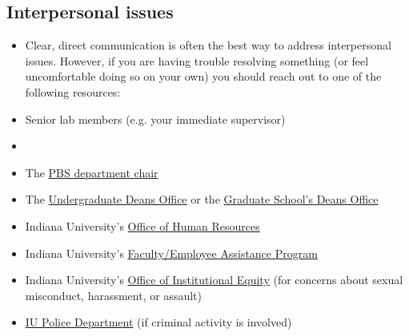 \documentclass{tufte-book} %
\begin{document}
\subsection{Interpersonal issues}\label{sec:interpersonal}
\begin{itemize}
\item Clear, direct communication is often the best way to address interpersonal issues. However, if you are having trouble resolving something (or feel uncomfortable doing so on your own) you should reach out to one of the following resources:

\item Senior lab members (e.g. your immediate supervisor)

\item \director

\item The \href{https://psych.indiana.edu/directory/faculty/hetrick-william-p.html}{PBS department chair}

\item The \href{https://studentaffairs.indiana.edu/dean-students/}{Undergraduate Deans Office} or the \href{https://graduate.indiana.edu/about/staff/index.html}{Graduate School's Deans Office}

\item Indiana University's \href{http://hr.iu.edu/welcome/contact.htm}{Office of Human Resources}

\item Indiana University's \href{https://one.iu.edu/task/iu/iueap}{Faculty/Employee Assistance Program}

\item Indiana University's \href{https://equity.iu.edu}{Office of Institutional Equity} (for concerns about sexual misconduct, harassment, or assault)

\item \href{https://iupd.indiana.edu}{IU Police Department} (if criminal activity is involved)
\end{itemize}
\end{document}
